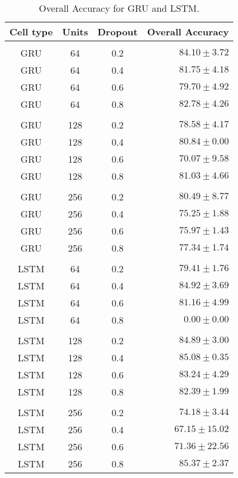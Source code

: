 \begin{table}[!htbp]
  \centering
  \begin{tabular}{cccr} 
      Cell type & Units & Dropout & Overall Accuracy\\[0.2cm] 
      \hline \\[-0.2cm] 
      GRU   &   64  & 0.2 &  $84.10 \pm 3.72$\\
      GRU   &   64  & 0.4 &  $81.75 \pm 4.18$\\
      GRU   &   64  & 0.6 &  $79.70 \pm 4.92$\\
      GRU   &   64  & 0.8 &  $82.78 \pm 4.26$\\[0.05cm] \hline \\[-0.25cm]
      GRU   &   128 & 0.2 &  $78.58 \pm 4.17$\\
      GRU   &   128 & 0.4 &  $80.84 \pm 0.00$\\
      GRU   &   128 & 0.6 &  $70.07 \pm 9.58$\\
      GRU   &   128 & 0.8 &  $81.03 \pm 4.66$\\[0.05cm] \hline \\[-0.25cm]
      GRU   &   256 & 0.2 &  $80.49 \pm 8.77$\\
      GRU   &   256 & 0.4 &  $75.25 \pm 1.88$\\
      GRU   &   256 & 0.6 &  $75.97 \pm 1.43$\\
      GRU   &   256 & 0.8 &  $77.34 \pm 1.74$\\[0.05cm] \hline \\[-0.25cm]
      LSTM  &   64  & 0.2 &  $79.41 \pm 1.76$\\
      LSTM  &   64  & 0.4 &  $84.92 \pm 3.69$\\
      LSTM  &   64  & 0.6 &  $81.16 \pm 4.99$\\
      LSTM  &   64  & 0.8 &  $0.00 \pm 0.00$\\[0.05cm] \hline \\[-0.25cm]
      LSTM  &   128 & 0.2 &  $84.89 \pm 3.00$\\
      LSTM  &   128 & 0.4 &  $85.08 \pm 0.35$\\
      LSTM  &   128 & 0.6 &  $83.24 \pm 4.29$\\
      LSTM  &   128 & 0.8 &  $82.39 \pm 1.99$\\[0.05cm] \hline \\[-0.25cm]
      LSTM  &   256 & 0.2 &  $74.18 \pm 3.44$\\
      LSTM  &   256 & 0.4 &  $67.15 \pm 15.02$\\
      LSTM  &   256 & 0.6 &  $71.36 \pm 22.56$\\
      LSTM  &   256 & 0.8 &  $85.37 \pm 2.37$\\ 
      
  \end{tabular}
  \caption{Overall Accuracy for GRU and LSTM.}
  \label{tab:AJRNNcelltype}
\end{table}

